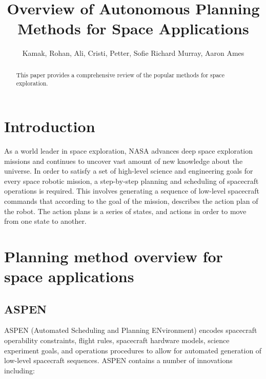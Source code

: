 \documentclass[conference]{IEEEtran}
\begin{document}

\title{\huge Overview of Autonomous Planning Methods for Space Applications}

\author{Kamak, Rohan, Ali, Cristi, Petter, Sofie Richard Murray, Aaron Ames}

\maketitle

\begin{abstract}
This paper provides a comprehensive review of the popular methods for space exploration.
\end{abstract}



\section{Introduction}
As a world leader in space exploration, NASA advances deep space exploration missions and continues to uncover vast amount of new knowledge about the universe.
In order to satisfy a set of high-level science and engineering goals for every space robotic mission, a step-by-step planning and scheduling of spacecraft operations is required. This involves generating a sequence of low-level spacecraft commands that according to the goal of the mission, describes the action plan of the robot. The action plans is a series of states, and actions in order to move from one state to another.


\section{Planning method overview for space applications}

\subsection{ASPEN}\label{sec:aspen}
ASPEN (Automated Scheduling and Planning ENvironment) encodes spacecraft operability constraints, flight rules, spacecraft hardware models, science experiment goals, and operations procedures to allow for automated generation of low-level spacecraft sequences. ASPEN contains a number of innovations including: 
\end{document}
